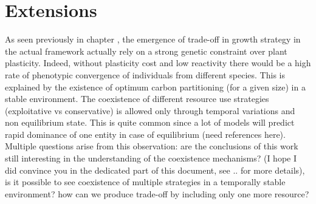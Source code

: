 
\chapter{Extensions}


%
%


As seen previously in chapter %
, the emergence of trade-off in growth strategy in the actual framework actually rely on a strong genetic constraint over plant plasticity. Indeed, without plasticity cost and low reactivity there would be a high rate of phenotypic convergence of individuals from different species. This is explained by the existence of optimum carbon partitioning (for a given size) in a stable environment. The coexistence of different resource use strategies (exploitative vs conservative) is allowed only through temporal variations and non equilibrium state. This is quite common since a lot of models will predict rapid dominance of one entity in case of equilibrium (need references here).\\
Multiple questions arise from this observation: are the conclusions of this work still interesting in the understanding of the coexistence mechanisms? (I hope I did convince you in the dedicated part of this document, see .. for more details), is it possible to see coexistence of multiple strategies in a temporally stable environment? how can we produce trade-off by including only one more resource?\\

